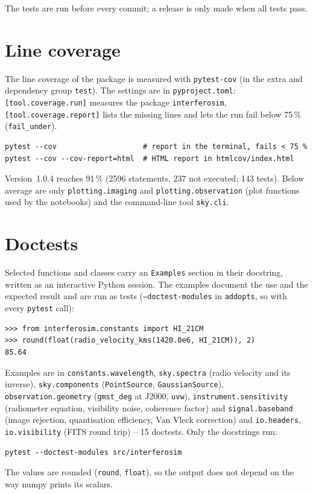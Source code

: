 The tests are run before every commit; a release is only made when all
tests pass.

\section{Line coverage}\label{sec:coverage}

The line coverage of the package is measured with \texttt{pytest-cov}
(in the extra and dependency group \texttt{test}). The settings are in
\texttt{pyproject.toml}: \texttt{[tool.coverage.run]} measures the
package \texttt{interferosim}, \texttt{[tool.coverage.report]} lists the
missing lines and lets the run fail below 75\,\% (\texttt{fail\_under}).
\begin{lstlisting}[basicstyle=\ttfamily\footnotesize, frame=single]
pytest --cov                    # report in the terminal, fails < 75 %
pytest --cov --cov-report=html  # HTML report in htmlcov/index.html
\end{lstlisting}
Version~1.0.4 reaches 91\,\% (2596 statements, 237 not executed;
143 tests). Below average are only \texttt{plotting.imaging} and
\texttt{plotting.observation} (plot functions used by the notebooks) and
the command-line tool \texttt{sky.cli}.

\section{Doctests}\label{sec:doctests}

Selected functions and classes carry an \texttt{Examples} section in
their docstring, written as an interactive Python session. The examples
document the use and the expected result and are run as tests
(\texttt{--doctest-modules} in \texttt{addopts}, so with every
\texttt{pytest} call):
\begin{lstlisting}[basicstyle=\ttfamily\footnotesize, frame=single]
>>> from interferosim.constants import HI_21CM
>>> round(float(radio_velocity_kms(1420.0e6, HI_21CM)), 2)
85.64
\end{lstlisting}
Examples are in \texttt{constants.wavelength},
\texttt{sky.spectra} (radio velocity and its inverse),
\texttt{sky.components} (\texttt{PointSource}, \texttt{GaussianSource}),
\texttt{observation.geometry} (\texttt{gmst\_deg} at J2000,
\texttt{uvw}), \texttt{instrument.sensitivity} (radiometer equation,
visibility noise, coherence factor) and \texttt{signal.baseband} (image
rejection, quantisation efficiency, Van Vleck correction)
and \texttt{io.headers}, \texttt{io.visibility} (FITS round trip) -- 15 doctests.
Only the docstrings run:
\begin{lstlisting}[basicstyle=\ttfamily\footnotesize, frame=single]
pytest --doctest-modules src/interferosim
\end{lstlisting}
The values are rounded (\texttt{round}, \texttt{float}), so the output
does not depend on the way numpy prints its scalars.

